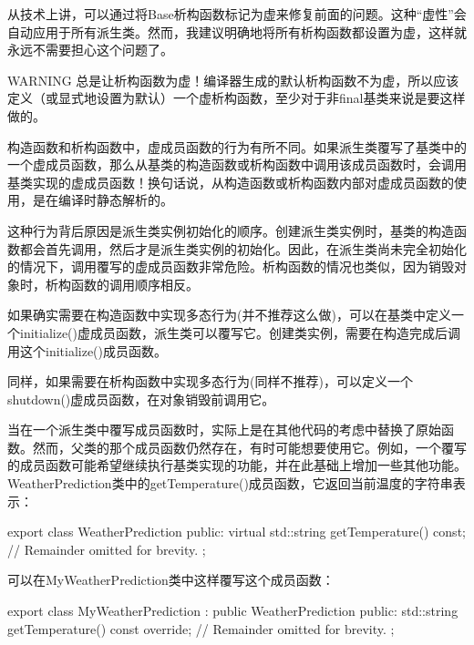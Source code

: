 从技术上讲，可以通过将Base析构函数标记为虚来修复前面的问题。这种“虚性”会自动应用于所有派生类。然而，我建议明确地将所有析构函数都设置为虚，这样就永远不需要担心这个问题了。

\begin{myWarning}{WARNING}
总是让析构函数为虚！编译器生成的默认析构函数不为虚，所以应该定义（或显式地设置为默认）一个虚析构函数，至少对于非final基类来说是要这样做的。
\end{myWarning}


构造函数和析构函数中，虚成员函数的行为有所不同。如果派生类覆写了基类中的一个虚成员函数，那么从基类的构造函数或析构函数中调用该成员函数时，会调用基类实现的虚成员函数！换句话说，从构造函数或析构函数内部对虚成员函数的使用，是在编译时静态解析的。

这种行为背后原因是派生类实例初始化的顺序。创建派生类实例时，基类的构造函数都会首先调用，然后才是派生类实例的初始化。因此，在派生类尚未完全初始化的情况下，调用覆写的虚成员函数非常危险。析构函数的情况也类似，因为销毁对象时，析构函数的调用顺序相反。

如果确实需要在构造函数中实现多态行为(并不推荐这么做)，可以在基类中定义一个initialize()虚成员函数，派生类可以覆写它。创建类实例，需要在构造完成后调用这个initialize()成员函数。

同样，如果需要在析构函数中实现多态行为(同样不推荐)，可以定义一个shutdown()虚成员函数，在对象销毁前调用它。


当在一个派生类中覆写成员函数时，实际上是在其他代码的考虑中替换了原始函数。然而，父类的那个成员函数仍然存在，有时可能想要使用它。例如，一个覆写的成员函数可能希望继续执行基类实现的功能，并在此基础上增加一些其他功能。WeatherPrediction类中的getTemperature()成员函数，它返回当前温度的字符串表示：

\begin{cpp}
export class WeatherPrediction
{
    public:
        virtual std::string getTemperature() const;
        // Remainder omitted for brevity.
};
\end{cpp}

可以在MyWeatherPrediction类中这样覆写这个成员函数：

\begin{cpp}
export class MyWeatherPrediction : public WeatherPrediction
{
    public:
        std::string getTemperature() const override;
        // Remainder omitted for brevity.
};
\end{cpp}


